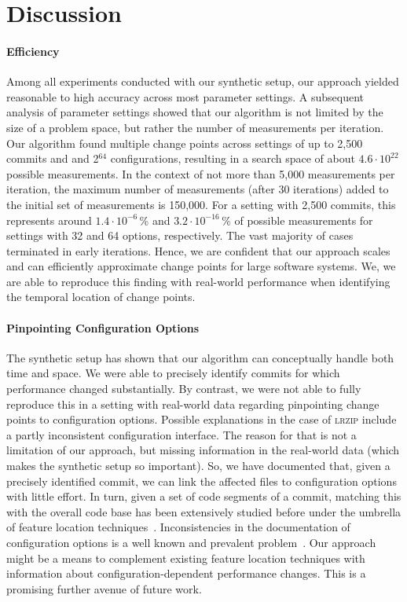 \documentclass[sigconf]{acmart}
\begin{document}
	\section{Discussion}
	\paragraph{Efficiency} Among all experiments conducted with our synthetic setup, our approach yielded reasonable to high accuracy across most parameter settings. A subsequent analysis of parameter settings showed that our algorithm is not limited by the size of a problem space, but rather the number of measurements per iteration. Our algorithm found multiple change points across settings of up to 2,500 commits and and 2$^{64}$ configurations, resulting in a search space of about $4.6 \cdot 10^{22}$ possible measurements.
	In the context of not more than 5,000 measurements per iteration, the maximum number of measurements (after 30 iterations) added to the initial set of measurements is 150,000. For a setting with 2,500 commits, this represents around $1.4 \cdot 10^{-6}$\,\% and $3.2\cdot 10^{-16}$\,\% of possible measurements for settings with 32 and 64 options, respectively. The vast majority of cases terminated in early iterations. Hence, we are confident that our approach scales and can efficiently approximate change points for large software systems. We, we are able to reproduce this finding with real-world performance when identifying the temporal location of change points.
	
	\paragraph{Pinpointing Configuration Options}
	The synthetic setup has shown that our algorithm can conceptually handle both time and space. We were able to precisely identify commits for which performance changed substantially. By contrast, we were not able to fully reproduce this in a setting with real-world data regarding pinpointing change points to configuration options. Possible explanations in the case of \textsc{lrzip} include a partly inconsistent configuration interface. 
	The reason for that is not a limitation of our approach, but missing information in the real-world data (which makes the synthetic setup so important). So, we have documented that, given a precisely identified commit, we can link the affected files to configuration options with little effort. In turn, given a set of code segments of a commit, matching this with the overall code base has been extensively studied before under the umbrella of feature location techniques~\cite{hill_which_2013}.
	Inconsistencies in the documentation of configuration options is a well known and prevalent problem~\cite{rabkin_static_2011}. Our approach might be a means to complement existing feature location techniques with information about configuration-dependent performance changes. This is a promising further avenue of future work.
	
\end{document}
